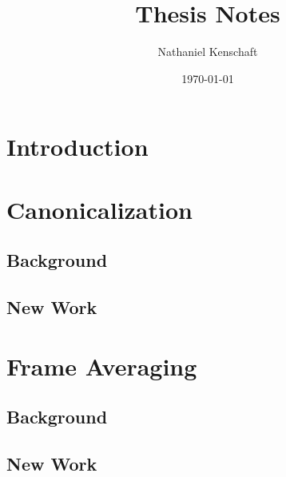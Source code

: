 \documentclass[12pt]{report}
\title{Thesis Notes}
\author{Nathaniel Kenschaft}
\date{\today}
\begin{document}
\maketitle

\newpage
\tableofcontents



\setcounter{chapter}{-1}
\chapter{Introduction}



\chapter{Canonicalization}\label{ch:canonicalization}
\section{Background}





\section{New Work}






\chapter{Frame Averaging}\label{ch:frame-averaging}
\section{Background}


\section{New Work}




\newpage
\printbibliography
\end{document}
